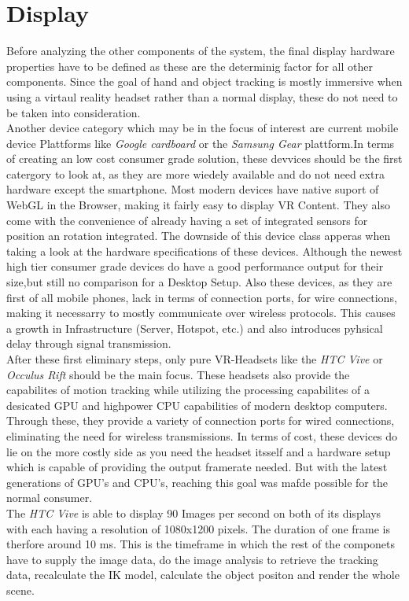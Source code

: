  \section{Display}
 Before analyzing the other components of the system, the final display hardware   properties have to be defined as these are the determinig factor for all other components. Since the goal of hand and object tracking is mostly immersive when using a virtaul reality headset rather than a normal display, these do not need to be taken into consideration.\\
Another device category which may be in the focus of interest are current mobile device Plattforms like \textit{Google cardboard} or the \textit{Samsung Gear} plattform.In terms of creating an low cost consumer grade solution, these devvices should be the first catergory to look at, as they are more wiedely available and do not need extra hardware except the smartphone. Most modern devices have native suport of WebGL in the Browser, making it fairly easy to display VR Content. They also come with the convenience of already having a set of integrated sensors for position an rotation integrated. The downside of this device class apperas when taking a look at the hardware specifications of these devices. Although the newest high tier consumer grade devices do have a good performance output for their size,but still no comparison for a Desktop Setup.  Also these devices, as they are first of all mobile phones, lack in terms of connection ports, for wire connections, making it necessarry to mostly communicate over wireless protocols. This causes a growth in  Infrastructure (Server, Hotspot, etc.) and also introduces pyhsical delay through signal transmission.\\
After these first eliminary steps, only pure VR-Headsets like the \textit{HTC Vive} or \textit{Occulus Rift}  should be the main focus. These headsets also provide the capabilites of motion tracking while utilizing the processing capabilites of a desicated GPU and highpower CPU capabilities of modern desktop computers. Through these, they provide a variety of connection ports for wired connections, eliminating the need for wireless transmissions. In terms of cost, these devices do lie on the more costly side as you need the headset itsself and a hardware setup which is capable of providing the output framerate needed. But with the latest generations of GPU's and CPU's, reaching this goal was mafde possible for the normal consumer.\\
The \textit{HTC Vive}   is able to display 90 Images per second on both of its displays with each having a resolution of 1080x1200 pixels. The duration of one frame is therfore around 10 ms. This is the timeframe in which the rest of the componets have to supply the image data, do the image analysis to retrieve the tracking data, recalculate the IK model, calculate the object positon and render the whole scene.

